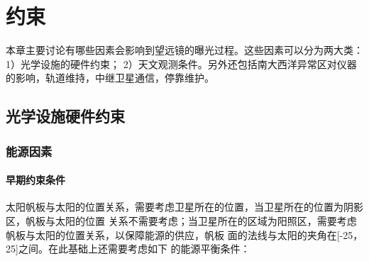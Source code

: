 
\chapter{约束}
本章主要讨论有哪些因素会影响到望远镜的曝光过程。这些因素可以分为两大类：1）光学设施的硬件约束；
2）天文观测条件。另外还包括南大西洋异常区对仪器的影响，轨道维持，中继卫星通信，停靠维护。




\section{光学设施硬件约束}

\subsection{能源因素}

\subsubsection{早期约束条件}
太阳帆板与太阳的位置关系，需要考虑卫星所在的位置，当卫星所在的位置为阴影区，帆板与太阳的位置
关系不需要考虑；当卫星所在的区域为阳照区，需要考虑帆板与太阳的位置关系，以保障能源的供应，帆板
面的法线与太阳的夹角在[-25\textdegree，25\textdegree]之间。在此基础上还需要考虑如下
的能源平衡条件：

